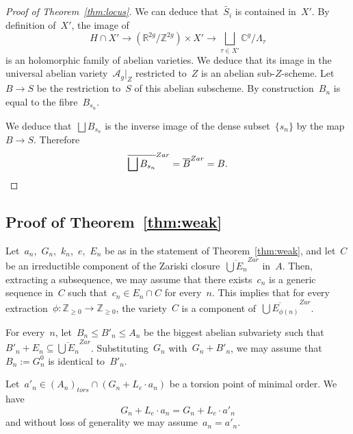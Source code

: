 \documentclass[12pt]{amsart}
\newcommand{\R}{{\mathbb R}}
\newcommand{\Z}{{\mathbb Z}}
\newcommand{\C}{{\mathbb C}}
\newcommand{\ol}{\overline}
\newcommand{\wt}[1]{{\widetilde{#1}}}
\begin{document}
\begin{proof}[Proof of Theorem~\ref{thm:locus}]
We can deduce that~$\wt{S_i}$ is contained in~$X'$. By definition of~$X'$, the image of
\[
H\cap X'\to (\R^{2g}/\Z^{2g})\times X'\to \bigsqcup_{\tau \in X'} \C^{g}/\Lambda_\tau
\]
is an holomorphic family of abelian varieties. We deduce that its image in the universal abelian variety~$\mathcal{A}_g|_Z$ restricted to~$Z$ is an abelian sub-$Z$-scheme. Let~$B\to S$ be the restriction to~$S$ of this abelian subscheme. By construction~$B_n$ is equal to the fibre~$B_{s_n}$.

We deduce that~${\bigsqcup B_{s_n}}$ is the inverse image of the dense subset~$\{s_n\}$ by the map~$B\to S$.
Therefore
\[
\ol{\bigsqcup B_{s_n}}^{Zar}=\ol{B}^{Zar}=B.\qedhere
\]
\end{proof}
\subsection{Proof of Theorem~\ref{thm:weak}} Let~$a_n$,~$G_n$,~$k_n$,~$e$,~$E_n$ be as in the statement  of Theorem~\ref{thm:weak}, and let~$C$ be an irreductible component of the Zariski closure~$\ol{\bigcup E_n}^{Zar}$ in~$A$. Then, extracting a subsequence, we may assume that there exists~$c_n$ is a generic sequence in~$C$ such that~$c_n\in E_n\cap C$ for every~$n$. This implies that for every extraction~$\phi:\Z_{\geq0}\to \Z_{\geq0}$, the variety~$C$ is a component of~$\ol{\bigcup E_{\phi(n)}}^{Zar}$.

For every~$n$, let~$B_n\leq B'_n\leq A_n$ be the biggest abelian subvariety such that~$B'_n+E_n\subseteq \ol{\bigcup E_n}^{Zar}$. Substituting~$G_n$ with~$G_n+B'_n$, we may assume that~$B_n:=G^0_n$ is identical to~$B'_n$.

Let~$a'_n\in (A_n)_{tors}\cap (G_n+L_e\cdot a_n)$ be a torsion point of minimal order. We have
\[
G_n+L_e\cdot a_n=G_n+L_e\cdot a'_n
\]
and without loss of generality we may assume~$a_n=a'_n$.
\end{document}
